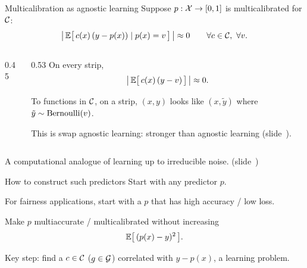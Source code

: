 \begin{frame}{Multicalibration as agnostic learning}
  Suppose $p : \mathcal{X} \to [0,1]$ is \alert{multicalibrated} for $\mathcal{C}$:
  \[
    \big|\,\mathbb{E}\big[\,c(x)\,(y - p(x)) \mid p(x) = v\,\big]\,\big| \approx 0
    \qquad \forall c \in \mathcal{C},\ \forall v .
  \]

  \begin{columns}[c]
    \begin{column}{0.45\textwidth}
      \centering
    \end{column}
    \begin{column}{0.53\textwidth}
      On every strip,
      \[
        \big|\,\mathbb{E}\big[\,c(x)\,(y - v)\,\big]\,\big| \approx 0 .
      \]

      To functions in $\mathcal{C}$, on a strip, $(x,y)$ looks like $(x,\tilde y)$
      where $\tilde y \sim \mathrm{Bernoulli}(v)$.

      \vspace{0.4em}
      This is \alert{swap agnostic learning}: stronger than agnostic learning
      \textcolor{muted}{(slide~)}.
    \end{column}
  \end{columns}

  \vspace{1.2em}
  \alert{A computational analogue of learning up to irreducible noise.}
  \textcolor{muted}{(slide~)}
\end{frame}

\begin{frame}{How to construct such predictors}
  Start with any predictor $p$.

  \textcolor{muted}{For fairness applications, start with a $p$ that has
  high accuracy / low loss.}

  \vspace{0.8em}
  Make $p$ multiaccurate / multicalibrated \alert{without increasing}
  \[
    \mathbb{E}\big[\,(p(x) - y)^2\,\big] .
  \]

  \vspace{0.5em}
  \alert{Key step:} find a $c \in \mathcal{C}$ ($g \in \mathcal{G}$) correlated with
  $y - p(x)$, a learning problem.

\end{frame}

